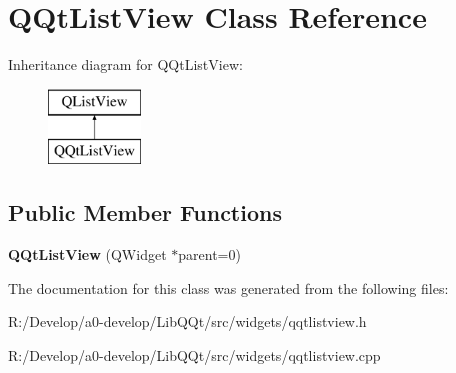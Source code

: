 \hypertarget{class_q_qt_list_view}{}\section{Q\+Qt\+List\+View Class Reference}
\label{class_q_qt_list_view}
Inheritance diagram for Q\+Qt\+List\+View\+:\begin{figure}[H]
\begin{center}
\leavevmode
\includegraphics[height=2.000000cm]{class_q_qt_list_view}
\end{center}
\end{figure}
\subsection*{Public Member Functions}
\begin{DoxyCompactItemize}
\item 
\mbox{\label{class_q_qt_list_view_ae5c5f697754f0b08b7f04a6127ca8cb7}} 
{\bfseries Q\+Qt\+List\+View} (Q\+Widget $\ast$parent=0)
\end{DoxyCompactItemize}


The documentation for this class was generated from the following files\+:\begin{DoxyCompactItemize}
\item 
R\+:/\+Develop/a0-\/develop/\+Lib\+Q\+Qt/src/widgets/qqtlistview.\+h\item 
R\+:/\+Develop/a0-\/develop/\+Lib\+Q\+Qt/src/widgets/qqtlistview.\+cpp\end{DoxyCompactItemize}
